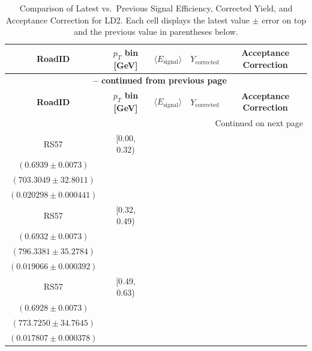 {\footnotesize
\renewcommand{\arraystretch}{1.35}
\begin{longtable}{|c|c|c|c|c|}
\caption{Comparison of Latest vs.\ Previous Signal Efficiency, Corrected Yield, and Acceptance Correction for LD2. Each cell displays the latest value $\pm$ error on top and the previous value in parentheses below.} \label{tab:eff_acc_comp_LD2} \\
\hline
\textbf{RoadID} & \textbf{$p_{T}$ bin [GeV]} & \textbf{$\langle E_{\mathrm{signal}} \rangle$} & \textbf{$Y_{\mathrm{corrected}}$} & \textbf{Acceptance Correction} \\
\hline
\endfirsthead
\multicolumn{5}{c}{{\bfseries \tablename\ \thetable{} -- continued from previous page}} \\
\hline
\textbf{RoadID} & \textbf{$p_{T}$ bin [GeV]} & \textbf{$\langle E_{\mathrm{signal}} \rangle$} & \textbf{$Y_{\mathrm{corrected}}$} & \textbf{Acceptance Correction} \\
\hline
\endhead
\hline \multicolumn{5}{|r|}{{Continued on next page}} \\ \hline
\endfoot
\hline
\endlastfoot
RS57 & [0.00, 0.32) & \begin{tabular}{@{}c@{}}$0.7272 \pm 0.0055$ \\ $(0.6939 \pm 0.0073)$\end{tabular} & \begin{tabular}{@{}c@{}}$671.0350 \pm 31.2961$ \\ $(703.3049 \pm 32.8011)$\end{tabular} & \begin{tabular}{@{}c@{}}$0.018048 \pm 0.000557$ \\ $(0.020298 \pm 0.000441)$\end{tabular} \\ \hline
RS57 & [0.32, 0.49) & \begin{tabular}{@{}c@{}}$0.7205 \pm 0.0056$ \\ $(0.6932 \pm 0.0073)$\end{tabular} & \begin{tabular}{@{}c@{}}$766.1041 \pm 33.9390$ \\ $(796.3381 \pm 35.2784)$\end{tabular} & \begin{tabular}{@{}c@{}}$0.017107 \pm 0.000492$ \\ $(0.019066 \pm 0.000392)$\end{tabular} \\ \hline
RS57 & [0.49, 0.63) & \begin{tabular}{@{}c@{}}$0.7256 \pm 0.0055$ \\ $(0.6928 \pm 0.0073)$\end{tabular} & \begin{tabular}{@{}c@{}}$738.6735 \pm 33.1896$ \\ $(773.7250 \pm 34.7645)$\end{tabular} & \begin{tabular}{@{}c@{}}$0.016748 \pm 0.000486$ \\ $(0.017807 \pm 0.000378)$\end{tabular} \\ \hline

\end{longtable}}
